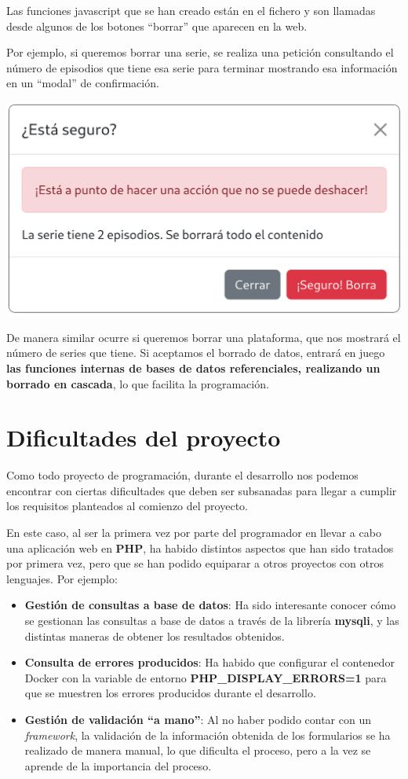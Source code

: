 \documentclass{\ClassPath/viu-tfm-template}
\begin{document}
Las funciones javascript que se han creado están en el fichero  y son llamadas desde algunos de los botones “borrar” que aparecen en la web.

Por ejemplo, si queremos borrar una serie, se realiza una petición consultando el número de episodios que tiene esa serie para terminar mostrando esa información en un “modal” de confirmación.

\vspace{-1em}
\begin{center}
    \includegraphics[width=0.5\linewidth]{img/modal.png}
\end{center}
\vspace{-1.5em}

De manera similar ocurre si queremos borrar una plataforma, que nos mostrará el número de series que tiene. Si aceptamos el borrado de datos, entrará en juego \textbf{las funciones internas de bases de datos referenciales, realizando un borrado en cascada}, lo que facilita la programación.

\chapter{Dificultades del proyecto}

Como todo proyecto de programación, durante el desarrollo nos podemos encontrar con ciertas dificultades que deben ser subsanadas para llegar a cumplir los requisitos planteados al comienzo del proyecto.

En este caso, al ser la primera vez por parte del programador en llevar a cabo una aplicación web en \textbf{PHP}, ha habido distintos aspectos que han sido tratados por primera vez, pero que se han podido equiparar a otros proyectos con otros lenguajes. Por ejemplo:

\vspace{-1em}
\begin{itemize}
    \item \textbf{Gestión de consultas a base de datos}: Ha sido interesante conocer cómo se gestionan las consultas a base de datos a través de la librería \textbf{mysqli}, y las distintas maneras de obtener los resultados obtenidos.
    \item \textbf{Consulta de errores producidos}: Ha habido que configurar el contenedor Docker con la variable de entorno \textbf{PHP\_DISPLAY\_ERRORS=1} para que se muestren los errores producidos durante el desarrollo.
    \item \textbf{Gestión de validación “a mano”}: Al no haber podido contar con un \textit{framework}, la validación de la información obtenida de los formularios se ha realizado de manera manual, lo que dificulta el proceso, pero a la vez se aprende de la importancia del proceso.
\end{itemize}
\end{document}
